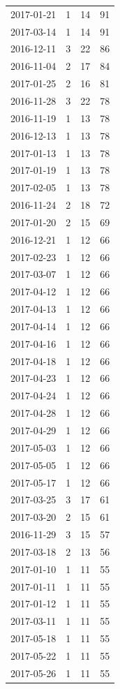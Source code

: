 \begin{tabular}{lrrr}
2017-01-21 & 1 & 14 & 91 \\
2017-03-14 & 1 & 14 & 91 \\
2016-12-11 & 3 & 22 & 86 \\
2016-11-04 & 2 & 17 & 84 \\
2017-01-25 & 2 & 16 & 81 \\
2016-11-28 & 3 & 22 & 78 \\
2016-11-19 & 1 & 13 & 78 \\
2016-12-13 & 1 & 13 & 78 \\
2017-01-13 & 1 & 13 & 78 \\
2017-01-19 & 1 & 13 & 78 \\
2017-02-05 & 1 & 13 & 78 \\
2016-11-24 & 2 & 18 & 72 \\
2017-01-20 & 2 & 15 & 69 \\
2016-12-21 & 1 & 12 & 66 \\
2017-02-23 & 1 & 12 & 66 \\
2017-03-07 & 1 & 12 & 66 \\
2017-04-12 & 1 & 12 & 66 \\
2017-04-13 & 1 & 12 & 66 \\
2017-04-14 & 1 & 12 & 66 \\
2017-04-16 & 1 & 12 & 66 \\
2017-04-18 & 1 & 12 & 66 \\
2017-04-23 & 1 & 12 & 66 \\
2017-04-24 & 1 & 12 & 66 \\
2017-04-28 & 1 & 12 & 66 \\
2017-04-29 & 1 & 12 & 66 \\
2017-05-03 & 1 & 12 & 66 \\
2017-05-05 & 1 & 12 & 66 \\
2017-05-17 & 1 & 12 & 66 \\
2017-03-25 & 3 & 17 & 61 \\
2017-03-20 & 2 & 15 & 61 \\
2016-11-29 & 3 & 15 & 57 \\
2017-03-18 & 2 & 13 & 56 \\
2017-01-10 & 1 & 11 & 55 \\
2017-01-11 & 1 & 11 & 55 \\
2017-01-12 & 1 & 11 & 55 \\
2017-03-11 & 1 & 11 & 55 \\
2017-05-18 & 1 & 11 & 55 \\
2017-05-22 & 1 & 11 & 55 \\
2017-05-26 & 1 & 11 & 55 \\

\end{tabular}
